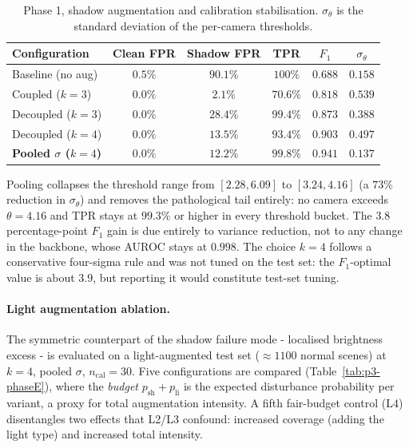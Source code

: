 \begin{table}[h]
  \centering
  \begin{tabular}{lccccc}
    \hline
    Configuration & Clean FPR & Shadow FPR & TPR & $F_1$ & $\sigma_\theta$ \\
    \hline
    Baseline (no aug) & $0.5\%$ & $90.1\%$ & $100\%$ & $0.688$ & $0.158$ \\
    Coupled ($k=3$) & $0.0\%$ & $2.1\%$ & $70.6\%$ & $0.818$ & $0.539$ \\
    Decoupled ($k=3$) & $0.0\%$ & $28.4\%$ & $99.4\%$ & $0.873$ & $0.388$ \\
    Decoupled ($k=4$) & $0.0\%$ & $13.5\%$ & $93.4\%$ & $0.903$ & $0.497$ \\
    \textbf{Pooled $\sigma$ ($k=4$)} & $\mathbf{0.0\%}$ & $\mathbf{12.2\%}$ & $\mathbf{99.8\%}$ & $\mathbf{0.941}$ & $\mathbf{0.137}$ \\
    \hline
  \end{tabular}
  \caption{Phase 1, shadow augmentation and calibration stabilisation.
  $\sigma_\theta$ is the standard deviation of the per-camera thresholds.}
  \label{tab:p3-phaseC}
\end{table}

Pooling collapses the threshold range from $[2.28, 6.09]$ to $[3.24, 4.16]$ (a
$73\%$ reduction in $\sigma_\theta$) and removes the pathological tail entirely:
no camera exceeds $\theta = 4.16$ and TPR stays at $99.3\%$ or higher in every
threshold bucket. The $3.8$ percentage-point $F_1$ gain is due entirely to
variance reduction, not to any change in the backbone, whose AUROC stays at
$0.998$. The choice $k=4$ follows a conservative four-sigma rule and was not
tuned on the test set: the $F_1$-optimal value is about $3.9$, but reporting it
would constitute test-set tuning.

\paragraph{Light augmentation ablation.}
The symmetric counterpart of the shadow failure mode - localised brightness
excess - is evaluated on a light-augmented test set ($\approx 1100$ normal
scenes) at $k=4$, pooled $\sigma$, $n_{\mathrm{cal}}=30$.
Five configurations are compared (Table~\ref{tab:p3-phaseE}), where the
\emph{budget} $p_{\mathrm{sh}} + p_{\mathrm{li}}$ is the expected disturbance
probability per variant, a proxy for total augmentation intensity. A fifth
fair-budget control (L4) disentangles two effects that L2/L3 confound: increased
coverage (adding the light type) and increased total intensity.

